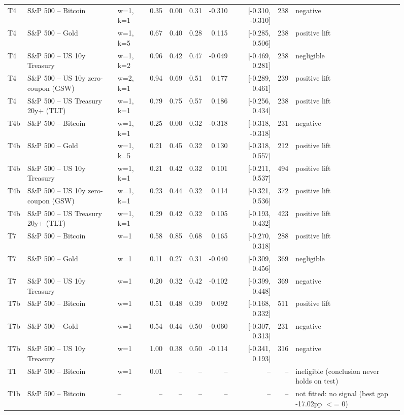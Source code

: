 \begin{figure}
\begin{tabular}{lllrrrrrrl}
T4 & S\&P 500 -- Bitcoin & w=1, k=1 & 0.35 & 0.00 & 0.31 & -0.310 & [-0.310, -0.310] & 238 & negative \\
T4 & S\&P 500 -- Gold & w=1, k=5 & 0.67 & 0.40 & 0.28 & 0.115 & [-0.285, 0.506] & 238 & positive lift \\
T4 & S\&P 500 -- US 10y Treasury & w=1, k=2 & 0.96 & 0.42 & 0.47 & -0.049 & [-0.469, 0.281] & 238 & negligible \\
T4 & S\&P 500 -- US 10y zero-coupon (GSW) & w=2, k=1 & 0.94 & 0.69 & 0.51 & 0.177 & [-0.289, 0.461] & 239 & positive lift \\
T4 & S\&P 500 -- US Treasury 20y+ (TLT) & w=1, k=1 & 0.79 & 0.75 & 0.57 & 0.186 & [-0.256, 0.434] & 238 & positive lift \\
T4b & S\&P 500 -- Bitcoin & w=1, k=1 & 0.25 & 0.00 & 0.32 & -0.318 & [-0.318, -0.318] & 231 & negative \\
T4b & S\&P 500 -- Gold & w=1, k=5 & 0.21 & 0.45 & 0.32 & 0.130 & [-0.318, 0.557] & 212 & positive lift \\
T4b & S\&P 500 -- US 10y Treasury & w=1, k=1 & 0.21 & 0.42 & 0.32 & 0.101 & [-0.211, 0.537] & 494 & positive lift \\
T4b & S\&P 500 -- US 10y zero-coupon (GSW) & w=1, k=1 & 0.23 & 0.44 & 0.32 & 0.114 & [-0.321, 0.536] & 372 & positive lift \\
T4b & S\&P 500 -- US Treasury 20y+ (TLT) & w=1, k=1 & 0.29 & 0.42 & 0.32 & 0.105 & [-0.193, 0.432] & 423 & positive lift \\
T7 & S\&P 500 -- Bitcoin & w=1 & 0.58 & 0.85 & 0.68 & 0.165 & [-0.270, 0.318] & 288 & positive lift \\
T7 & S\&P 500 -- Gold & w=1 & 0.11 & 0.27 & 0.31 & -0.040 & [-0.309, 0.456] & 369 & negligible \\
T7 & S\&P 500 -- US 10y Treasury & w=1 & 0.20 & 0.32 & 0.42 & -0.102 & [-0.399, 0.448] & 369 & negative \\
T7b & S\&P 500 -- Bitcoin & w=1 & 0.51 & 0.48 & 0.39 & 0.092 & [-0.168, 0.332] & 511 & positive lift \\
T7b & S\&P 500 -- Gold & w=1 & 0.54 & 0.44 & 0.50 & -0.060 & [-0.307, 0.313] & 231 & negative \\
T7b & S\&P 500 -- US 10y Treasury & w=1 & 1.00 & 0.38 & 0.50 & -0.114 & [-0.341, 0.193] & 316 & negative \\
T1 & S\&P 500 -- Bitcoin & w=1 & 0.01 & -- & -- & -- & -- & -- & ineligible (conclusion never holds on test) \\
T1b & S\&P 500 -- Bitcoin & -- & -- & -- & -- & -- & -- & -- & not fitted: no signal (best gap -17.02pp $<$= 0) \\

\end{tabular}
\end{figure}
